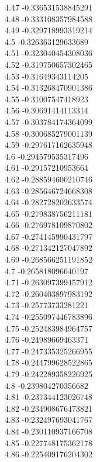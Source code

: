 {4.47	-0.336531538845291\\
4.48	-0.333108357984588\\
4.49	-0.329718993319214\\
4.5	-0.326363129633689\\
4.51	-0.323040454308036\\
4.52	-0.319750657302465\\
4.53	-0.31649343114205\\
4.54	-0.313268470901386\\
4.55	-0.31007547418923\\
4.56	-0.30691414113314\\
4.57	-0.303784174364099\\
4.58	-0.300685279001139\\
4.59	-0.297617162635948\\
4.6	-0.294579535317496\\
4.61	-0.29157210953664\\
4.62	-0.288594600210746\\
4.63	-0.285646724668308\\
4.64	-0.282728202633574\\
4.65	-0.279838756211181\\
4.66	-0.276978109870802\\
4.67	-0.274145990431797\\
4.68	-0.271342127047892\\
4.69	-0.268566251191852\\
4.7	-0.265818096640197\\
4.71	-0.263097399457912\\
4.72	-0.260403897983192\\
4.73	-0.25773733281221\\
4.74	-0.255097446783896\\
4.75	-0.252483984964757\\
4.76	-0.24989669463371\\
4.77	-0.247335325266955\\
4.78	-0.244799628522865\\
4.79	-0.242289358226925\\
4.8	-0.239804270356682\\
4.81	-0.237344123026748\\
4.82	-0.234908676473821\\
4.83	-0.232497693041767\\
4.84	-0.230110937166708\\
4.85	-0.227748175362178\\
4.86	-0.225409176204302\\
}
